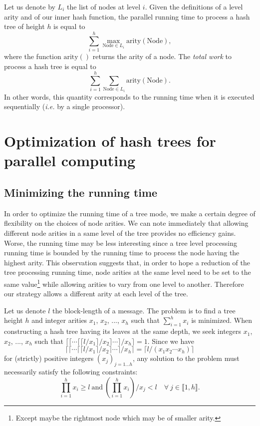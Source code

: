 \documentclass{llncs}
\begin{document}
Let us denote by $L_i$ the list of nodes at level $i$. 
Given the definitions of a level arity and of our inner hash function, 
the parallel running time to process a hash tree of height $h$ is equal to 
\[\sum_{i=1}^h \max_{\mathrm{Node} \in L_i} \mathrm{arity}(\mathrm{Node}),\]
where the function $\mathrm{arity()}$ returns the arity of a node.
The \textit{total work} to process a hash tree is equal to
\[\sum_{i=1}^h \sum_{\mathrm{Node} \in L_i} \mathrm{arity}(\mathrm{Node}).\]
In other words, this quantity corresponds to the running time when it is executed 
sequentially (\textit{i.e.} by a single processor).

\section{Optimization of hash trees for parallel computing}\label{sec:optim}

\subsection{Minimizing the running time}\label{subsec:runni}

In order to optimize the running time of a tree mode, we make a certain degree of flexibility 
on the choices of node arities. 
We can note immediately that allowing different node arities in a same level of the tree provides no efficiency gains. Worse, 
the running time may be less interesting since a tree level processing running time is bounded by the running time to process the node 
having the highest arity. 
This observation suggests that, in order to hope a reduction of the tree processing running time, node arities at the same level need to be set 
to the same value\footnote{Except maybe the rightmost node which may be of smaller arity.} while allowing arities to vary from one level to another.
Therefore our strategy allows a different arity at each level of the tree.

Let us denote $l$ the block-length of a message. The problem is to find a tree height $h$ and integer arities $x_1$, $x_2$, ..., $x_h$ 
such that $\sum_{i=1}^h x_i$ is minimized. When constructing a hash tree having its leaves at the same depth,
we seek integers $x_1$, $x_2$, ..., $x_h$ such that $\lceil \lceil \cdots \lceil \lceil l/x_1 \rceil / x_2 \rceil \cdots \rceil/ x_h \rceil = 1$.
Since we have 
\[\lceil \lceil \cdots \lceil \lceil l/x_1 \rceil / x_2 \rceil \cdots \rceil/ x_h \rceil = \lceil l/(x_1x_2 \cdots x_h) \rceil\]
for (strictly) positive integers $(x_j)_{j=1 \ldots h}$,
any solution to the problem must necessarily satisfy the following constraints:
\begin{equation}\label{contraintes}
\prod_{i=1}^h x_i \ge l\ \textrm{and}\ 
\left(\prod_{i=1}^{h} x_i\right)/x_j < l\quad \forall\ j \in \llbracket 1,h \rrbracket.
\end{equation}
\end{document}
